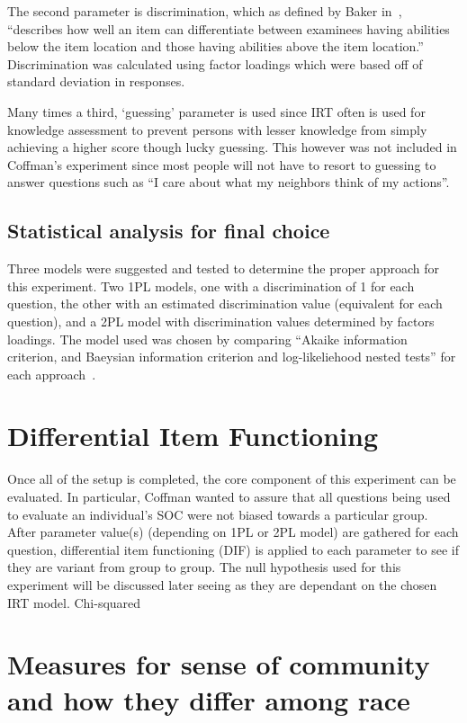 \documentclass{sig-alternate}
\begin{document}
The second parameter is discrimination, which as defined by Baker in~\cite{irt:2001}, ``describes how well an item can differentiate between examinees having abilities below the item location and those having abilities above the item location.'' Discrimination was calculated using factor loadings which were based off of standard deviation in responses.

Many times a third, `guessing' parameter is used since IRT often is used for knowledge assessment to prevent persons with lesser knowledge from simply achieving a higher score though lucky guessing. This however was not included in Coffman's experiment since most people will not have to resort to guessing to answer questions such as ``I care about what my neighbors think of my actions''.

\subsection{Statistical analysis for final choice}
Three models were suggested and tested to determine the proper approach for this experiment. Two 1PL models, one with a discrimination of 1 for each question, the other with an estimated discrimination value (equivalent for each question), and a 2PL model with discrimination values determined by factors loadings. The model used was chosen by comparing ``Akaike information criterion, and Baeysian information criterion and log-likeliehood nested tests'' for each approach~\cite{disparities:2009}.

\section{Differential Item Functioning}
Once all of the setup is completed, the core component of this experiment can be evaluated. In particular, Coffman wanted to assure that all questions being used to evaluate an individual's SOC were not biased towards a particular group. After parameter value(s) (depending on 1PL or 2PL model) are gathered for each question, differential item functioning (DIF) is applied to each parameter to see if they are variant from group to group. The null hypothesis used for this experiment will be discussed later seeing as they are dependant on the chosen IRT model. Chi-squared 







\section{Measures for sense of community and how they differ among race}
\end{document}
